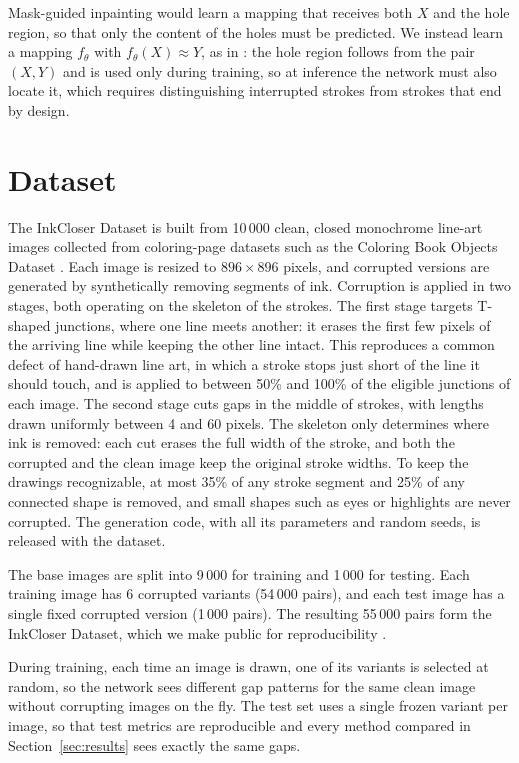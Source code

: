 \documentclass[11pt]{article}
\begin{document}
Mask-guided inpainting would learn a mapping that receives both $X$ and the hole
region, so that only the content of the holes must be predicted. We instead learn
a mapping $f_\theta$ with $f_\theta(X) \approx Y$, as in \citet{sasaki2017joint}:
the hole region follows from the pair $(X, Y)$ and is used only during training,
so at inference the network must also locate it, which requires distinguishing
interrupted strokes from strokes that end by design.

\section{Dataset}
\label{sec:dataset}

The InkCloser Dataset is built from 10\,000 clean, closed monochrome line-art images
collected from coloring-page datasets such as the Coloring Book Objects Dataset
\citep{chen2019human}. Each image is resized to $896 \times 896$ pixels, and
corrupted versions are generated by synthetically removing segments of ink.
Corruption is applied in two stages, both operating on the skeleton of the strokes.
The first stage targets T-shaped junctions, where one line meets another: it erases
the first few pixels of the arriving line while keeping the other line intact. This
reproduces a common defect of hand-drawn line art, in which a stroke stops just
short of the line it should touch, and is applied to between 50\% and 100\% of the
eligible junctions of each image. The second stage cuts gaps in the middle of
strokes, with lengths drawn uniformly between 4 and 60 pixels. The skeleton only
determines where ink is removed: each cut erases the full width of the stroke, and
both the corrupted and the clean image keep the original stroke widths. To keep the drawings recognizable, at most 35\% of any stroke segment and
25\% of any connected shape is removed, and small shapes such as eyes or highlights
are never corrupted. The generation code, with all its parameters and random seeds,
is released with the dataset.

The base images are split into 9\,000 for training and 1\,000 for testing. Each
training image has 6 corrupted variants (54\,000 pairs), and each test image has a
single fixed corrupted version (1\,000 pairs). The resulting 55\,000 pairs form the
InkCloser Dataset, which we make public for reproducibility
\citep{datasetInkCloser}.

During training, each time an image is drawn, one of its variants is selected at
random, so the network sees different gap patterns for the same clean image without
corrupting images on the fly. The test set uses a single frozen variant per image,
so that test metrics are reproducible and every method compared in
Section~\ref{sec:results} sees exactly the same gaps.
\end{document}
